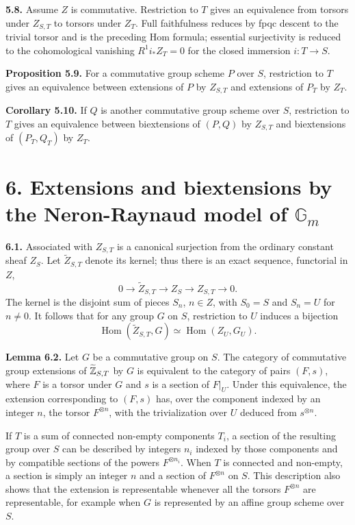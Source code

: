 \documentclass[11pt]{article}
\providecommand{\Gm}{\mathbb G_m}
\providecommand{\Hom}{\operatorname{Hom}}
\begin{document}
\textbf{5.8.}  Assume \(Z\) is commutative.  Restriction to \(T\) gives an equivalence from torsors under \(Z_{S,T}\) to torsors under \(Z_T\).  Full faithfulness reduces by fpqc descent to the trivial torsor and is the preceding Hom formula; essential surjectivity is reduced to the cohomological vanishing \(R^1i_*Z_T=0\) for the closed immersion \(i:T\to S\).

\textbf{Proposition 5.9.}  For a commutative group scheme \(P\) over \(S\), restriction to \(T\) gives an equivalence between extensions of \(P\) by \(Z_{S,T}\) and extensions of \(P_T\) by \(Z_T\).

\textbf{Corollary 5.10.}  If \(Q\) is another commutative group scheme over \(S\), restriction to \(T\) gives an equivalence between biextensions of \((P,Q)\) by \(Z_{S,T}\) and biextensions of \((P_T,Q_T)\) by \(Z_T\).

\section*{6. Extensions and biextensions by the Neron-Raynaud model of \(\Gm\)}

\textbf{6.1.}  Associated with \(Z_{S,T}\) is a canonical surjection from the ordinary constant sheaf \(Z_S\).  Let \(\widetilde Z_{S,T}\) denote its kernel; thus there is an exact sequence, functorial in \(Z\),
\[
  0\longrightarrow \widetilde Z_{S,T}\longrightarrow Z_S\longrightarrow Z_{S,T}\longrightarrow 0.
\]
The kernel is the disjoint sum of pieces \(S_n\), \(n\in Z\), with \(S_0=S\) and \(S_n=U\) for \(n\neq0\).  It follows that for any group \(G\) on \(S\), restriction to \(U\) induces a bijection
\[
  \Hom(\widetilde Z_{S,T},G)\simeq \Hom(Z_U,G_U).
\]

\textbf{Lemma 6.2.}  Let \(G\) be a commutative group on \(S\).  The category of commutative group extensions of \(\widetilde{\mathbb Z}_{S,T}\) by \(G\) is equivalent to the category of pairs \((F,s)\), where \(F\) is a torsor under \(G\) and \(s\) is a section of \(F|_U\).  Under this equivalence, the extension corresponding to \((F,s)\) has, over the component indexed by an integer \(n\), the torsor \(F^{\otimes n}\), with the trivialization over \(U\) deduced from \(s^{\otimes n}\).

If \(T\) is a sum of connected non-empty components \(T_i\), a section of the resulting group over \(S\) can be described by integers \(n_i\) indexed by those components and by compatible sections of the powers \(F^{\otimes n_i}\).  When \(T\) is connected and non-empty, a section is simply an integer \(n\) and a section of \(F^{\otimes n}\) on \(S\).  This description also shows that the extension is representable whenever all the torsors \(F^{\otimes n}\) are representable, for example when \(G\) is represented by an affine group scheme over \(S\).
\end{document}
